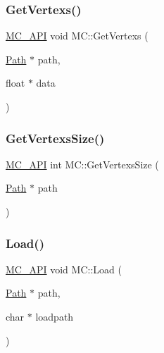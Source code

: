 \mbox{\label{namespace_m_c_a15bafddf753bfddf2799228e129a731b}} 
\subsubsection{\texorpdfstring{GetVertexs()}{GetVertexs()}}
{\footnotesize\ttfamily \mbox{\hyperlink{_mesh___creator___controller_8hpp_a529916b90fdb2765a7b955fded854b0a}{M\+C\+\_\+\+A\+PI}} void M\+C\+::\+Get\+Vertexs (\begin{DoxyParamCaption}\item[{\mbox{\hyperlink{class_m_c_1_1_path}{Path}} $\ast$}]{path,  }\item[{float $\ast$}]{data }\end{DoxyParamCaption})}

\mbox{\label{namespace_m_c_acb5b27fd73e4b58e3259f83cedf8cd6e}} 
\subsubsection{\texorpdfstring{GetVertexsSize()}{GetVertexsSize()}}
{\footnotesize\ttfamily \mbox{\hyperlink{_mesh___creator___controller_8hpp_a529916b90fdb2765a7b955fded854b0a}{M\+C\+\_\+\+A\+PI}} int M\+C\+::\+Get\+Vertexs\+Size (\begin{DoxyParamCaption}\item[{\mbox{\hyperlink{class_m_c_1_1_path}{Path}} $\ast$}]{path }\end{DoxyParamCaption})}

\mbox{\label{namespace_m_c_a70d345d29c8bf1ec85c58472505f1476}} 
\subsubsection{\texorpdfstring{Load()}{Load()}}
{\footnotesize\ttfamily \mbox{\hyperlink{_mesh___creator___controller_8hpp_a529916b90fdb2765a7b955fded854b0a}{M\+C\+\_\+\+A\+PI}} void M\+C\+::\+Load (\begin{DoxyParamCaption}\item[{\mbox{\hyperlink{class_m_c_1_1_path}{Path}} $\ast$}]{path,  }\item[{char $\ast$}]{loadpath }\end{DoxyParamCaption})}

